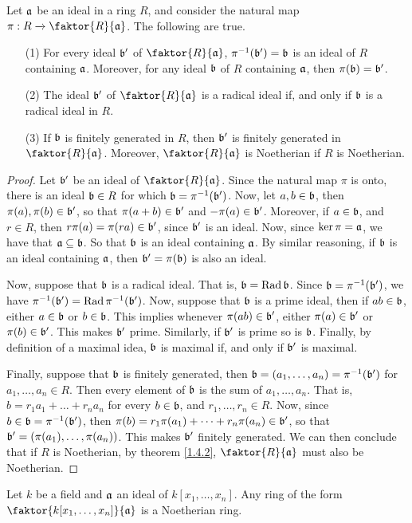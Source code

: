 \begin{theorem}\label{1.4.4}
     Let $\af$ be an ideal in a ring $R$, and consider the natural map $\pi:R
     \xrightarrow{} \faktor{R}{\af}$. The following are true.
     \begin{enumerate}
         \item[(1)] For every ideal $\bf'$ of $\faktor{R}{\af}$,
             $\inv{\pi}(\bf')=\bf$ is an ideal of $R$ containing $\af$.
             Moreover, for any ideal $\bf$ of $R$ containing $\af$, then
             $\pi(\bf)=\bf'$.

         \item[(2)] The ideal $\bf'$ of $\faktor{R}{\af}$ is a radical ideal if,
             and only if $\bf$ is a radical ideal in $R$.

         \item[(3)] If $\bf$ is finitely generated in $R$, then $\bf'$ is
             finitely generated in $\faktor{R}{\af}$. Moreover,
             $\faktor{R}{\af}$ is Noetherian if $R$ is Noetherian.
     \end{enumerate}
 \end{theorem}
 \begin{proof}
     Let $\bf'$ be an ideal of $\faktor{R}{\af}$. Since the natural map $\pi$ is
     onto, there is an ideal $\bf \in R$ for which $\bf=\inv{\pi}(\bf')$. Now,
     let $a,b \in \bf$, then $\pi(a),\pi(b) \in \bf'$, so that $\pi(a+b) \in
     \bf'$ and $-\pi(a) \in \bf'$. Moreover, if $a \in \bf$, and $r \in R$, then
     $r\pi(a)=\pi(ra) \in \bf'$, since $\bf'$ is an ideal. Now, since
     $\ker{\pi}=\af$, we have that $\af \subseteq \bf$. So that $\bf$ is an
     ideal containing $\af$. By similar reasoning, if $\bf$ is an ideal
     containing $\af$, then $\bf'=\pi(\bf)$ is also an ideal.

     Now, suppose that $\bf$ is a radical ideal. That is, $\bf=\Rad{\bf}$. Since
     $\bf=\inv{\pi}(\bf')$, we have $\inv{\pi}(\bf')=\Rad{\inv{\pi}(\bf')}$.
     Now, suppose that $\bf$ is a prime ideal, then if $ab \in \bf$, either $a
     \in \bf$ or $b \in \bf$. This implies whenever $\pi(ab) \in \bf'$, either
     $\pi(a) \in \bf'$ or $\pi(b) \in \bf'$. This makes $\bf'$ prime. Similarly,
     if $\bf'$ is prime so is $\bf$. Finally, by definition of a maximal idea,
     $\bf$ is maximal if, and only if $\bf'$ is maximal.

     Finally, suppose that $\bf$ is finitely generated, then $\bf=(a_1, \dots,
     a_n)=\inv{\pi}(\bf')$ for $a_1, \dots, a_n \in R$. Then every element of
     $\bf$ is the sum of $a_1, \dots, a_n$. That is, $b=r_1a_1+\dots+r_na_n$ for
     every $b \in \bf$, and $r_1, \dots, r_n \in R$. Now, since $b \in
     \bf=\inv{\pi}(\bf')$, then $\pi(b)=r_1\pi(a_1)+\dots+r_n\pi(a_n) \in \bf'$,
     so that $\bf'=(\pi(a_1), \dots, \pi(a_n))$. This makes $\bf'$ finitely
     generated. We can then conclude that if $R$ is Noetherian, by theorem
     \ref{1.4.2}, $\faktor{R}{\af}$ must also be Noetherian.
 \end{proof}
 \begin{corollary}
     Let $k$ be a field and $\af$ an ideal of $k[x_1, \dots, x_n]$. Any ring of
     the form $\faktor{k[x_1, \dots, x_n]}{\af}$ is a Noetherian ring.
 \end{corollary}
